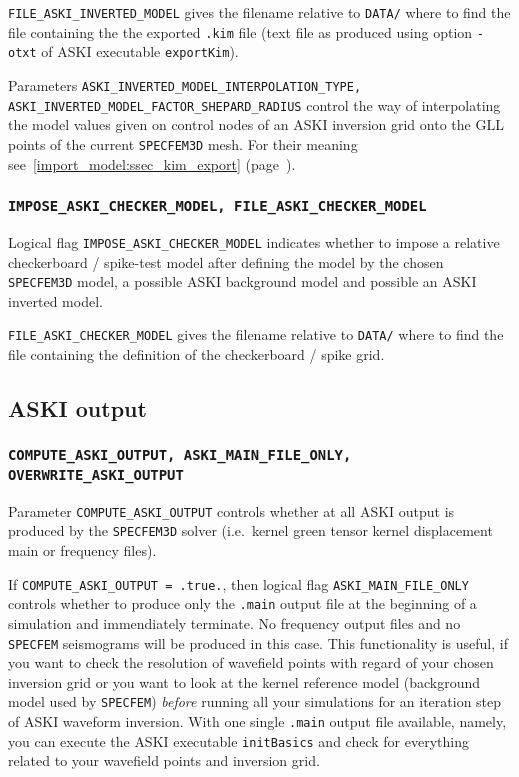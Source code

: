 \documentclass[12pt,a4paper]{article}
\newcommand{\lcode}[1]{\nolinkurl{#1}}
\newcommand{\lcodetitle}[1]{ {\ttfamily #1} }
\newcommand{\ASKI}{ {\ttfamily ASKI} }
\newcommand{\myref}[1]{\ref{#1} (page~\pageref{#1})}
\begin{document}
\lcode{FILE_ASKI_INVERTED_MODEL} gives the filename relative to \lcode{DATA/} where to find the file containing
the the exported \lcode{.kim} file (text file as produced using option \lcode{-otxt} of \ASKI{} executable 
\lcode{exportKim}).

Parameters \lcode{ASKI_INVERTED_MODEL_INTERPOLATION_TYPE, ASKI_INVERTED_MODEL_FACTOR_SHEPARD_RADIUS} control the
way of interpolating the model values given on control nodes of an \ASKI{} inversion grid onto the GLL points of
the current \lcode{SPECFEM3D} mesh. For their meaning see~\myref{import_model:ssec_kim_export}.

\subsubsection*{\lcode{IMPOSE_ASKI_CHECKER_MODEL, FILE_ASKI_CHECKER_MODEL}}
Logical flag \lcode{IMPOSE_ASKI_CHECKER_MODEL} indicates whether to impose a relative checkerboard / 
spike-test model after defining the model by the chosen \lcode{SPECFEM3D} model, a possible 
\ASKI{} background model and possible an \ASKI{} inverted model.

\lcode{FILE_ASKI_CHECKER_MODEL} gives the filename relative to \lcode{DATA/} where to find the file containing
the definition of the checkerboard / spike grid.

\subsection{\lcodetitle{ASKI} output} \label{Par_file_ASKI,sub:output}
\subsubsection*{\lcode{COMPUTE_ASKI_OUTPUT, ASKI_MAIN_FILE_ONLY, OVERWRITE_ASKI_OUTPUT}}
Parameter \lcode{COMPUTE_ASKI_OUTPUT} controls whether at all \ASKI{} output is produced by the \lcode{SPECFEM3D} 
solver (i.e.\ kernel green tensor kernel displacement main or frequency files). 

If \lcode{COMPUTE_ASKI_OUTPUT = .true.}, then logical flag \lcode{ASKI_MAIN_FILE_ONLY} controls whether to
produce only the \lcode{.main} output file at the beginning of a simulation and immendiately terminate. No
frequency output files and no \lcode{SPECFEM} seismograms will be produced in this case. This functionality
is useful, if you want to check the resolution of wavefield points with regard of your chosen inversion grid 
or you want to look at the kernel reference model (background model used by \lcode{SPECFEM}) \emph{before}
running all your simulations for an iteration step of \ASKI{} waveform inversion. With one single \lcode{.main}
output file available, namely, you can execute the \ASKI{} executable \lcode{initBasics} and check for everything
related to your wavefield points and inversion grid.
\end{document}
